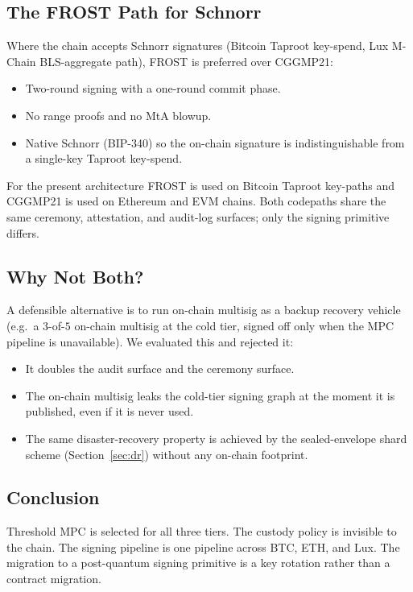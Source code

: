 \subsection{The FROST Path for Schnorr}

Where the chain accepts Schnorr signatures (Bitcoin Taproot
key-spend, Lux M-Chain BLS-aggregate path), FROST \cite{frost} is
preferred over CGGMP21:

\begin{itemize}[nosep]
\item Two-round signing with a one-round commit phase.
\item No range proofs and no MtA blowup.
\item Native Schnorr (BIP-340) so the on-chain signature is
indistinguishable from a single-key Taproot key-spend.
\end{itemize}

For the present architecture FROST is used on Bitcoin Taproot
key-paths and CGGMP21 is used on Ethereum and EVM chains. Both
codepaths share the same ceremony, attestation, and audit-log
surfaces; only the signing primitive differs.

\subsection{Why Not Both?}

A defensible alternative is to run on-chain multisig as a backup
recovery vehicle (e.g.\ a $3$-of-$5$ on-chain multisig at the cold
tier, signed off only when the MPC pipeline is unavailable). We
evaluated this and rejected it:

\begin{itemize}[nosep]
\item It doubles the audit surface and the ceremony surface.
\item The on-chain multisig leaks the cold-tier signing graph at
the moment it is published, even if it is never used.
\item The same disaster-recovery property is achieved by the
sealed-envelope shard scheme (Section~\ref{sec:dr}) without any
on-chain footprint.
\end{itemize}

\subsection{Conclusion}

Threshold MPC is selected for all three tiers. The custody policy
is invisible to the chain. The signing pipeline is one pipeline
across BTC, ETH, and Lux. The migration to a post-quantum signing
primitive is a key rotation rather than a contract migration.

